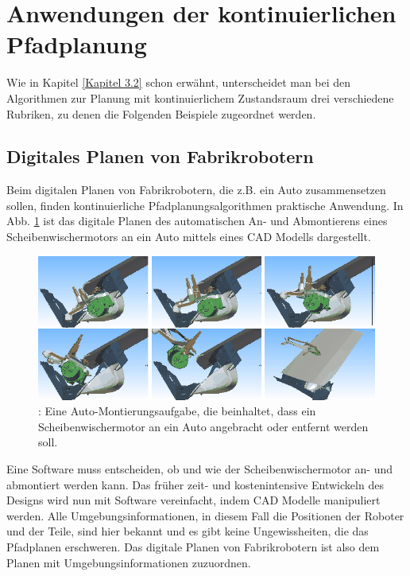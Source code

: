 \section{Anwendungen der kontinuierlichen Pfadplanung}
Wie in Kapitel \ref{Kapitel 3.2} schon erwähnt, unterscheidet man bei den Algorithmen zur Planung mit kontinuierlichem Zustandsraum drei verschiedene Rubriken, zu denen die Folgenden Beispiele zugeordnet werden.
\subsection{Digitales Planen von Fabrikrobotern}
Beim digitalen Planen von Fabrikrobotern, die z.B. ein Auto zusammensetzen sollen, finden kontinuierliche Pfadplanungsalgorithmen praktische Anwendung. In Abb. \ref{Abb. 4.2} ist das digitale Planen des automatischen An- und Abmontierens eines Scheibenwischermotors an ein Auto mittels eines CAD Modells dargestellt.
\begin{figure}
	\centering
	\includegraphics[width=0.7\linewidth]{images/img231}
	\caption{\cite[~S. 7, Abb. 1.3]{Lav06}: Eine Auto-Montierungsaufgabe, die beinhaltet, dass ein Scheibenwischermotor an ein Auto angebracht oder entfernt werden soll.}
	\label{Abb. 4.2}
\end{figure}
\noindent
Eine Software muss entscheiden, ob und wie der Scheibenwischermotor an- und abmontiert werden kann. Das früher zeit- und kostenintensive Entwickeln des Designs wird nun mit Software vereinfacht, indem CAD Modelle manipuliert werden. Alle Umgebungsinformationen, in diesem Fall die Positionen der Roboter und der Teile, sind hier bekannt und es gibt keine Ungewissheiten, die das Pfadplanen erschweren\cite[~S. 6 ff]{Lav06}. Das digitale Planen von Fabrikrobotern ist also dem Planen mit Umgebungsinformationen zuzuordnen.



